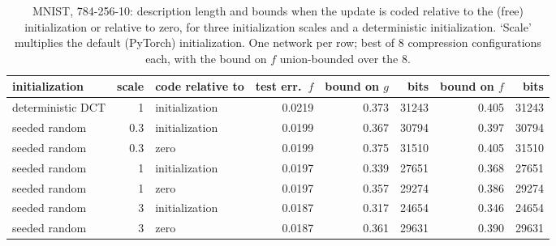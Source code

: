 \begin{table}[t]
\centering\small
\begin{adjustbox}{max width=\linewidth}\begin{tabular}{l r l r r r r r}
\toprule
initialization & scale & code relative to & test err.\ $f$ & bound on $g$ & bits & bound on $f$ & bits \\
\midrule
deterministic DCT & 1 & initialization & 0.0219 & 0.373 & 31243 & 0.405 & 31243 \\
seeded random & 0.3 & initialization & 0.0199 & 0.367 & 30794 & 0.397 & 30794 \\
seeded random & 0.3 & zero & 0.0199 & 0.375 & 31510 & 0.405 & 31510 \\
seeded random & 1 & initialization & 0.0197 & 0.339 & 27651 & 0.368 & 27651 \\
seeded random & 1 & zero & 0.0197 & 0.357 & 29274 & 0.386 & 29274 \\
seeded random & 3 & initialization & 0.0187 & 0.317 & 24654 & 0.346 & 24654 \\
seeded random & 3 & zero & 0.0187 & 0.361 & 29631 & 0.390 & 29631 \\
\bottomrule
\end{tabular}\end{adjustbox}
\caption{MNIST, 784-256-10: description length and bounds when the update is coded relative to the (free) initialization or relative to zero, for three initialization scales and a deterministic initialization. `Scale' multiplies the default (PyTorch) initialization. One network per row; best of 8 compression configurations each, with the bound on $f$ union-bounded over the 8.}\label{tab:init}
\end{table}

